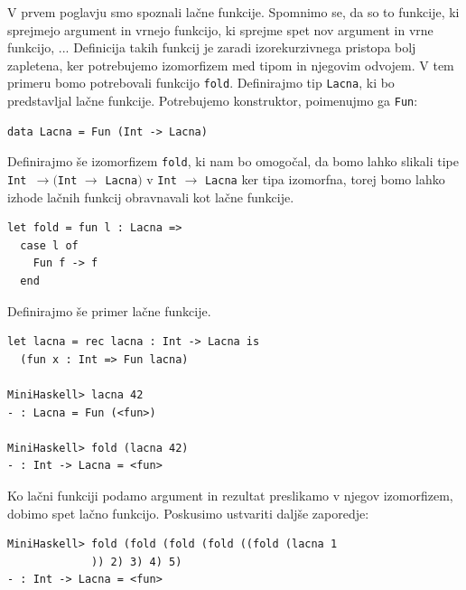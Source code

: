 \documentclass[a4paper,12pt,openright]{book}
\begin{document}
V prvem poglavju smo spoznali lačne funkcije. Spomnimo se, da so to funkcije, ki sprejmejo argument in vrnejo funkcijo, ki sprejme spet nov argument in vrne funkcijo, ... Definicija 
takih funkcij je zaradi izorekurzivnega pristopa bolj zapletena, ker potrebujemo izomorfizem med tipom in njegovim odvojem. V tem primeru bomo potrebovali funkcijo \lstinline{fold}. 
Definirajmo tip \lstinline{Lacna}, ki bo predstavljal lačne funkcije. Potrebujemo konstruktor, poimenujmo ga \lstinline{Fun}:
\begin{lstlisting}
data Lacna = Fun (Int -> Lacna)
\end{lstlisting}
Definirajmo še izomorfizem \lstinline{fold}, ki nam bo omogočal, da bomo lahko slikali tipe \lstinline{Int }$\rightarrow ($\lstinline{Int} $\rightarrow$ \lstinline{Lacna}$)$ v \lstinline{Int} $\rightarrow$ \lstinline{Lacna} 
ker tipa izomorfna, torej bomo lahko izhode lačnih funkcij obravnavali kot lačne funkcije.
\begin{lstlisting}
let fold = fun l : Lacna =>
  case l of
    Fun f -> f
  end
\end{lstlisting}
Definirajmo še primer lačne funkcije.
\begin{lstlisting}
let lacna = rec lacna : Int -> Lacna is
  (fun x : Int => Fun lacna)

MiniHaskell> lacna 42
- : Lacna = Fun (<fun>)

MiniHaskell> fold (lacna 42)
- : Int -> Lacna = <fun>
\end{lstlisting}
Ko lačni funkciji podamo argument in rezultat preslikamo v njegov izomorfizem, dobimo spet lačno funkcijo. Poskusimo ustvariti daljše zaporedje:
\begin{lstlisting}
MiniHaskell> fold (fold (fold (fold ((fold (lacna 1
             )) 2) 3) 4) 5)
- : Int -> Lacna = <fun>
\end{lstlisting}
\end{document}
